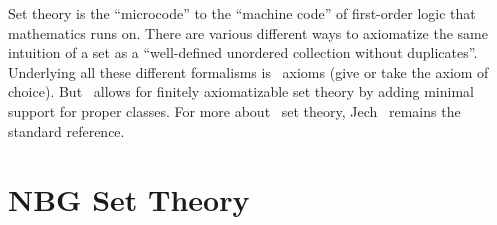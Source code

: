 \begin{node}\label{set-0000}%
Set theory is the ``microcode'' to the ``machine code'' of first-order
logic that mathematics runs on. There are various different ways to
axiomatize the same intuition of a set as a ``well-defined unordered
collection without duplicates''. Underlying all these different
formalisms is \ZFC\ axioms (give or take the axiom of choice). But
\NBG\ allows for finitely axiomatizable set theory by adding minimal
support for proper classes. For more about \ZFC\ set theory,
Jech~\cite{jech2003set} remains the standard reference.
\end{node}

\section{NBG Set Theory}
